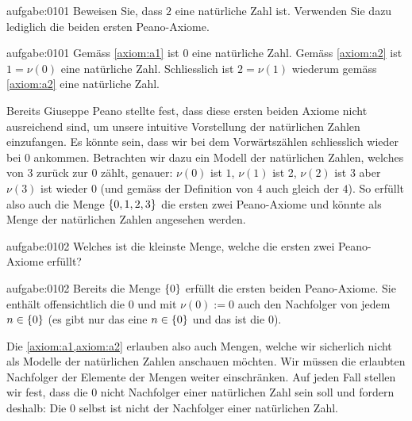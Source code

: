 \begin{aufgabe}{aufgabe:0101}
{Beweisen Sie, dass $2$ eine natürliche Zahl ist. Verwenden Sie dazu lediglich die beiden ersten Peano-Axiome.}
\end{aufgabe}
\begin{antwort}{aufgabe:0101}
Gemäss \cref{axiom:a1} ist $0$ eine natürliche Zahl. Gemäss \cref{axiom:a2} ist $1=\nu(0)$ eine natürliche Zahl. Schliesslich ist $2=\nu(1)$ wiederum gemäss \cref{axiom:a2} eine natürliche Zahl.
\end{antwort}
Bereits Giuseppe Peano stellte fest, dass diese ersten beiden Axiome nicht ausreichend sind, um unsere intuitive Vorstellung der natürlichen Zahlen einzufangen. Es könnte sein, dass wir bei dem Vorwärtszählen schliesslich wieder bei $0$ ankommen. Betrachten wir dazu ein Modell der natürlichen Zahlen, welches von $3$ zurück zur $0$ zählt, genauer: $\nu(0)$ ist $1$, $\nu(1)$ ist 2, $\nu(2)$ ist $3$ aber $\nu(3)$ ist wieder $0$ (und gemäss der Definition von $4$ auch gleich der $4$). So erfüllt also auch die Menge $\left\{0,1,2,3\right\}$ die ersten zwei Peano-Axiome und könnte als Menge der natürlichen Zahlen angesehen werden.
\begin{aufgabe}{aufgabe:0102}
{Welches ist die kleinste Menge, welche die ersten zwei Peano-Axiome erfüllt?}
\end{aufgabe}
\begin{antwort}{aufgabe:0102}
Bereits die Menge $\left\{0\right\}$ erfüllt die ersten beiden Peano-Axiome. Sie enthält offensichtlich die $0$ und mit $\nu(0):=0$ auch den Nachfolger von jedem $n\in\left\{0\right\}$ (es gibt nur das eine $n\in\left\{0\right\}$ und das ist die $0$).
\end{antwort}
Die \cref{axiom:a1,axiom:a2} erlauben also auch Mengen, welche wir sicherlich nicht als Modelle der natürlichen Zahlen anschauen möchten. Wir müssen die erlaubten Nachfolger der Elemente der Mengen weiter einschränken. Auf jeden Fall stellen wir fest, dass die $0$ nicht Nachfolger einer natürlichen Zahl sein soll und fordern deshalb:
{Die $0$ selbst ist nicht der Nachfolger einer natürlichen Zahl.} %


